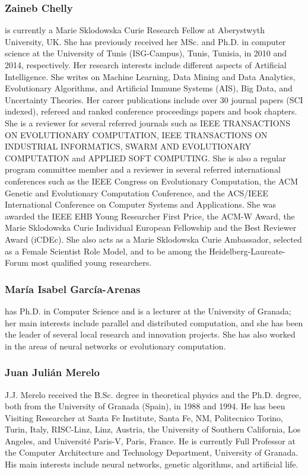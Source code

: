 \subsubsection* {Zaineb Chelly} is currently a Marie Sklodowska Curie Research Fellow at Aberystwyth University, UK. She has previously received her MSc. and Ph.D. in computer science at the University of Tunis (ISG-Campus), Tunis, Tunisia, in 2010 and 2014, respectively. Her research interests include different aspects of Artificial Intelligence. She writes on Machine Learning, Data Mining and Data Analytics, Evolutionary Algorithms, and Artificial Immune Systems (AIS), Big Data, and Uncertainty Theories. Her career publications include over 30 journal papers (SCI indexed), refereed and ranked conference proceedings papers and book chapters. She is a reviewer for several referred journals such as IEEE TRANSACTIONS ON EVOLUTIONARY COMPUTATION, IEEE TRANSACTIONS ON INDUSTRIAL INFORMATICS, SWARM AND EVOLUTIONARY COMPUTATION and APPLIED SOFT COMPUTING. She is also a regular program committee member and a reviewer in several referred international conferences such as the IEEE Congress on Evolutionary Computation, the ACM Genetic and Evolutionary Computation Conference, and the ACS/IEEE International Conference on Computer Systems and Applications. She was awarded the IEEE EHB Young Researcher First Price, the ACM-W Award, the Marie Sklodowska Curie Individual European Fellowship and the Best Reviewer Award (iCDEc). She also acts as a Marie Sklodowska Curie Ambassador, selected as a Female Scientist Role Model, and to be among the Heidelberg-Laureate-Forum most qualified young researchers.

\subsubsection{Mar\'ia Isabel Garc\'ia-Arenas} has Ph.D. in Computer Science and is a
lecturer at the University of Granada; her main interests
include parallel and distributed computation, and she has
been the leader of several local research and innovation
projects. She has also worked in the areas of neural
networks or evolutionary computation.

\subsubsection{Juan Juli\'an Merelo} J.J. Merelo received the B.Sc. degree in theoretical
physics and the Ph.D. degree, both from the University
of Granada (Spain), in 1988 and 1994. He has been
Visiting Researcher at Santa Fe Institute, Santa Fe, NM,
Politecnico Torino, Turin, Italy, RISC-Linz, Linz, Austria,
the University of Southern California, Los Angeles, and
Université Paris-V, Paris, France. He is currently Full
Professor at the Computer Architecture and Technology
Department, University of Granada. His main interests
include neural networks, genetic algorithms, and artificial
life.




